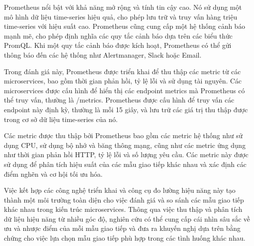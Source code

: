 Prometheus nổi bật với khả năng mở rộng và tính tin cậy cao. Nó sử dụng một mô hình dữ liệu time-series hiệu quả, cho phép lưu trữ và truy vấn hàng triệu time-series với hiệu suất cao. Prometheus cũng cung cấp một hệ thống cảnh báo mạnh mẽ, cho phép định nghĩa các quy tắc cảnh báo dựa trên các biểu thức PromQL. Khi một quy tắc cảnh báo được kích hoạt, Prometheus có thể gửi thông báo đến các hệ thống như Alertmanager, Slack hoặc Email.

Trong đánh giá này, Prometheus được triển khai để thu thập các metric từ các microservices, bao gồm thời gian phản hồi, tỷ lệ lỗi và sử dụng tài nguyên. Các microservices được cấu hình để hiển thị các endpoint metrics mà Prometheus có thể truy vấn, thường là /metrics. Prometheus được cấu hình để truy vấn các endpoint này định kỳ, thường là mỗi 15 giây, và lưu trữ các giá trị thu thập được trong cơ sở dữ liệu time-series của nó.

Các metric được thu thập bởi Prometheus bao gồm các metric hệ thống như sử dụng CPU, sử dụng bộ nhớ và băng thông mạng, cũng như các metric ứng dụng như thời gian phản hồi HTTP, tỷ lệ lỗi và số lượng yêu cầu. Các metric này được sử dụng để phân tích hiệu suất của các mẫu giao tiếp khác nhau và xác định các điểm nghẽn và cơ hội tối ưu hóa.

Việc kết hợp các công nghệ triển khai và công cụ đo lường hiệu năng này tạo thành một môi trường toàn diện cho việc đánh giá và so sánh các mẫu giao tiếp khác nhau trong kiến trúc microservices. Thông qua việc thu thập và phân tích dữ liệu hiệu năng từ nhiều góc độ, nghiên cứu có thể cung cấp cái nhìn sâu sắc về ưu và nhược điểm của mỗi mẫu giao tiếp và đưa ra khuyến nghị dựa trên bằng chứng cho việc lựa chọn mẫu giao tiếp phù hợp trong các tình huống khác nhau.